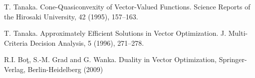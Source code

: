 \documentclass[a4paper,11pt]{jsarticle}
\theoremstyle{definition}
\begin{document}
\begin{thebibliography}{99}
  T. Tanaka. Cone-Quasiconvexity of Vector-Valued Functions. Science Reports of the Hirosaki University, 42 (1995), 157--163.

  T. Tanaka. Approximately Efficient Solutions in Vector Optimization. J. Multi-Criteria Decision Analysis, 5 (1996), 271--278.

  R.I. Bo\c{t}, S.-M. Grad and G. Wanka. Duality in Vector Optimization, Springer-Verlag, Berlin-Heidelberg (2009)
\end{thebibliography}
\end{document}
